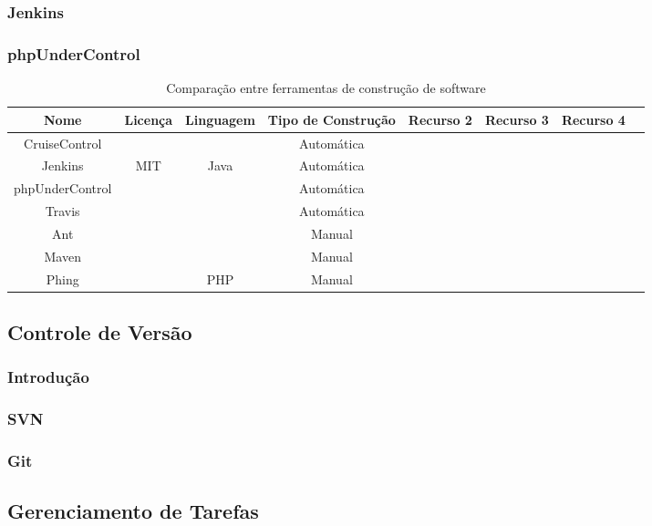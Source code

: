 \documentclass[12pt,a4paper]{article}
\begin{document}
		\subsubsection{Jenkins}
		\subsubsection{phpUnderControl}
		
		\begin{table}[h]
			\tabcolsep=0.11cm
			\begin{tabular}{|c|c|c|c|c|c|c|c|}
			\hline Nome 			& Licença 	& Linguagem & Tipo de Construção 	& Recurso 2 & Recurso 3 & Recurso 4  \\
			\hline  CruiseControl	&  			&  			& Automática			&  			&  			&  			\\
			\hline  Jenkins			& MIT		& Java		& Automática			&  			&  			&  			\\
			\hline  phpUnderControl	&  			&  			& Automática 			&  			&  			&  			\\ 
			\hline  Travis			&  			&  			& Automática			&  			&  			&  			\\ 
			\hline  Ant				&  			&  			& Manual				&  			&  			&  			\\ 
			\hline  Maven			&  			&  			& Manual				&  			&  			&  			\\ 
			\hline  Phing			&  			& PHP		& Manual				&  			&  			&  			\\
			\hline  
			\end{tabular} 
			\caption{Comparação entre ferramentas de construção de software}
		\end{table}
		
	\subsection{Controle de Versão}
		\subsubsection{Introdução}
		\subsubsection{SVN}
		\subsubsection{Git}
		
	\subsection{Gerenciamento de Tarefas}
\end{document}
